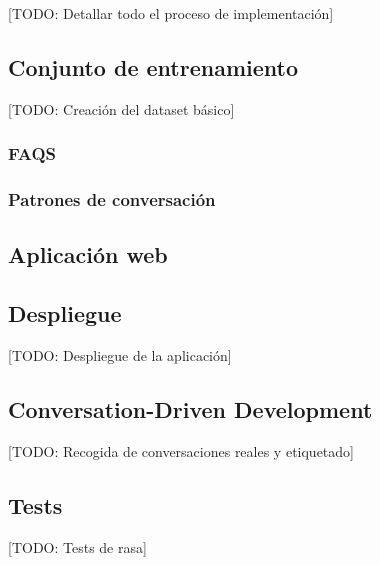 [TODO: Detallar todo el proceso de implementación]

\subsection{Conjunto de entrenamiento}
[TODO: Creación del dataset básico]

\subsubsection{FAQS}

\subsubsection{Patrones de conversación}

\subsection{Aplicación web}

\subsection{Despliegue}
[TODO: Despliegue de la aplicación]

\subsection{Conversation-Driven Development}
[TODO: Recogida de conversaciones reales y etiquetado]

\subsection{Tests}
[TODO: Tests de rasa]

